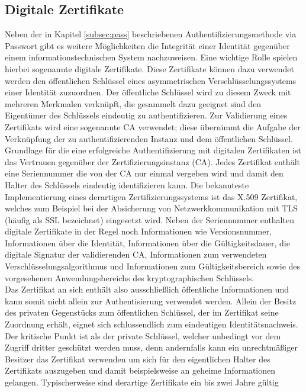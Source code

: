 \documentclass[
book,
a4paper,   
titlepage,  
halfparskip,
12pt        
]{scrartcl}
\begin{document}
\begin{onehalfspacing}
\subsection{Digitale Zertifikate}
\label{subsec:zert}
Neben der in Kapitel \vref{subsec:pass} beschriebenen Authentifizierungsmethode via Passwort gibt es weitere Möglichkeiten die Integrität einer Identität gegenüber einem informationstechnischen System nachzuweisen. Eine wichtige Rolle spielen hierbei sogenannte digitale Zertifikate. Diese Zertifikate können dazu verwendet werden den öffentlichen Schlüssel eines asymmetrischen Verschlüsselungssystems einer Identität zuzuordnen. Der öffentliche Schlüssel wird zu diesem Zweck mit mehreren Merkmalen verknüpft, die gesammelt dazu geeignet sind den Eigentümer des Schlüssels eindeutig zu authentifizieren. Zur Validierung eines Zertifikats wird eine sogenannte \ac{CA} verwendet; diese übernimmt die Aufgabe der Verknüpfung der zu authentifizierenden Instanz und dem öffentlichen Schlüssel. Grundlage für die eine erfolgreiche Authentifizierung mit digitalen Zertifikaten ist das Vertrauen gegenüber der Zertifizierungsinstanz (\ac{CA}). Jedes Zertifikat enthält eine Seriennummer die von der \ac{CA} nur einmal vergeben wird und damit den Halter des Schlüssels eindeutig identifizieren kann. Die bekannteste Implementierung eines derartigen Zertifizierungssystems ist das X.509 Zertifikat, welches zum Beispiel bei der Absicherung von Netzwerkkommunikation mit \ac{TLS} (häufig als \ac{SSL} bezeichnet) eingesetzt wird. Neben der Seriennummer enthalten digitale Zertifikate in der Regel noch Informationen wie Versionsnummer, Informationen über die Identität, Informationen über die Gültigkeitsdauer, die digitale Signatur der validierenden \ac{CA}, Informationen zum verwendeten Verschlüsselungsalgorithmus und Informationen zum Gültigkeitsbereich sowie des vorgesehenen Anwendungsbereichs des kryptographischen Schlüssels.\cite[S. 144]{kerberos2}\\
Das Zertifikat an sich enthält also ausschließlich öffentliche Informationen und kann somit nicht allein zur Authentisierung verwendet werden. Allein der Besitz des privaten Gegenstücks zum öffentlichen Schlüssel, der im Zertifikat seine Zuordnung erhält, eignet sich schlussendlich zum eindeutigen Identitätsnachweis. Der kritische Punkt ist als der private Schlüssel, welcher unbedingt vor dem Zugriff dritter geschützt werden muss, denn andernfalls kann ein unrechtmäßiger Besitzer das Zertifikat verwenden um sich für den eigentlichen Halter des Zertifikats auszugeben und damit beispielsweise an geheime Informationen gelangen. Typischerweise sind derartige Zertifikate ein bis zwei Jahre gültig\cite[S. 145f]{kerberos2}\\


\end{onehalfspacing}
\end{document}

